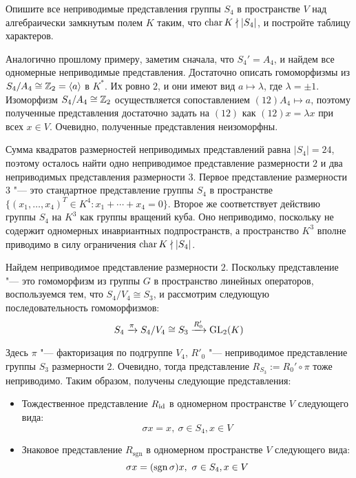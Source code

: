 \begin{problem}
	Опишите все неприводимые представления группы $S_4$ в пространстве $V$ над алгебраически замкнутым полем $K$ таким, что $\operatorname{char}{K} \nmid |S_4|$, и постройте таблицу характеров.
\end{problem}

\begin{example}
	 Аналогично прошлому примеру, заметим сначала, что $S_4' = A_4$, и найдем все одномерные неприводимые представления. Достаточно описать гомоморфизмы из $S_4 / A_4 \cong \mathbb{Z}_2 = \langle a \rangle$ в $K^*$. Их ровно $2$, и они имеют вид $a \mapsto \lambda$, где $\lambda = \pm 1$. Изоморфизм $S_4 / A_4 \cong \mathbb{Z}_2$ осуществляется сопоставлением $(12)A_4 \mapsto a$, поэтому полученные представления достаточно задать на $(12)$ как $(12) x = \lambda x$ при всех $x \in V$. Очевидно, полученные представления неизоморфны.
	
	Сумма квадратов размерностей неприводимых представлений равна $|S_4| = 24$, поэтому осталось найти одно неприводимое представление размерности $2$ и два неприводимых представления размерности $3$. Первое представление размерности $3$ "--- это стандартное представление группы $S_4$ в пространстве $\{(x_1, \dotsc, x_4)^T \in K^4 : x_1 + \dotsb + x_4 = 0\}$. Второе же соответствует действию группы $S_4$ на $K^3$ как группы вращений куба. Оно неприводимо, поскольку не содержит одномерных инавриантных подпространств, а пространство $K^3$ вполне приводимо в силу ограничения $\operatorname{char}{K} \nmid |S_4|$.
	
	Найдем неприводимое представление размерности $2$. Поскольку представление "--- это гомоморфизм из группы $G$ в пространство линейных операторов, воспользуемся тем, что $S_4 / V_4 \cong S_3$, и рассмотрим следующую последовательность гомоморфизмов:
	\[S_4 \xrightarrow{\pi} S_4 / V_4 \cong S_3 \xrightarrow{R'_0} \operatorname{GL}_2(K)\]
	
	Здесь $\pi$ "--- факторизация по подгруппе $V_4$, $R'_0$ "--- неприводимое представление группы $S_3$ размерности $2$. Очевидно, тогда представление $R_{S_3} := R_0' \circ \pi$ тоже неприводимо. Таким образом, получены следующие представления:
	\begin{itemize}
		\item Тождественное представление $R_{\mathrm{id}}$ в одномерном пространстве $V$ следующего вида:
		\[\sigma x = x,~\sigma \in S_4, x \in V\]
		
		\item Знаковое представление $R_{\mathrm{sgn}}$ в одномерном пространстве $V$ следующего вида:
		\[\sigma x = (\operatorname{sgn}\sigma)x,~\sigma \in S_4, x \in V\]
		

\end{itemize}
\end{example}
